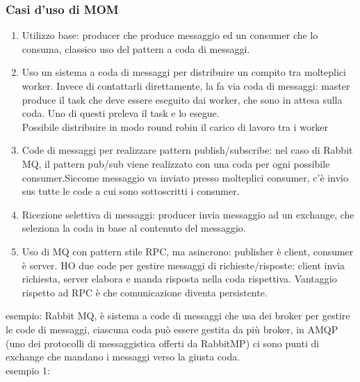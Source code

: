 \documentclass{article}
\begin{document}
\subsubsection{Casi d'uso di MOM}
\begin{enumerate}
\item Utilizzo base: producer che produce messaggio ed un consumer che lo consuma, classico uso del pattern a coda di messaggi.
\item Uso un sistema a coda di messaggi per distribuire un compito tra molteplici worker. Invece di contattarli direttamente, la fa via coda di messaggi: master produce il task che deve essere eseguito dai worker, che sono in attesa sulla coda. Uno di questi preleva il task e lo esegue.\\ Possibile distribuire in modo round robin il carico di lavoro tra i worker
\item Code di messaggi per realizzare pattern publish/subscribe: nel caso di Rabbit MQ, il pattern pub/sub viene realizzato con una coda per ogni possibile consumer.Siccome messaggio va inviato presso molteplici consumer, c'è invio sus tutte le code a cui sono sottoscritti i consumer.
\item Ricezione selettiva di messaggi: producer invia messaggio ad un exchange, che seleziona la coda in base al contenuto del messaggio.
\item Uso di MQ con pattern stile RPC, ma asincrono: publisher è client, consumer è server. HO due code per gestire messaggi di richieste/risposte: client invia richiesta, server elabora e manda risposta nella coda rispettiva. Vantaggio rispetto ad RPC è che comunicazione diventa persistente.
\end{enumerate}
esempio: Rabbit MQ, è sistema a code di messaggi che usa dei broker per gestire le code di messaggi, ciascuna coda può essere gestita da più broker, in AMQP (uno dei protocolli di messaggistica offerti da RabbitMP) ci sono punti di exchange che mandano i  messaggi verso la giusta coda.\\
esempio 1:
\end{document}
